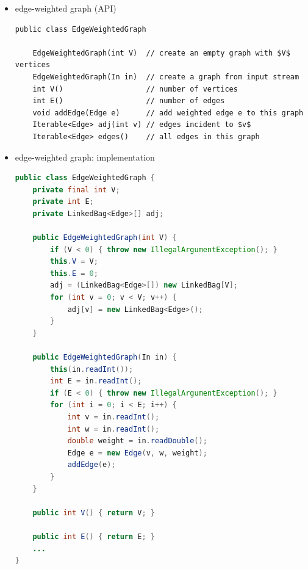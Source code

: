\documentclass[8pt,a4paper,compress]{beamer}
\begin{document}
\begin{frame}[fragile]
\begin{itemize}
\item edge-weighted graph (API)
\begin{lstlisting}[language={},mathescape]
public class EdgeWeightedGraph

    EdgeWeightedGraph(int V)  // create an empty graph with $V$ vertices
    EdgeWeightedGraph(In in)  // create a graph from input stream
    int V()                   // number of vertices 
    int E()                   // number of edges
    void addEdge(Edge e)      // add weighted edge e to this graph
    Iterable<Edge> adj(int v) // edges incident to $v$
    Iterable<Edge> edges()    // all edges in this graph
\end{lstlisting}
\end{itemize}
\end{frame}

\begin{frame}[fragile]
\begin{itemize}
\item edge-weighted graph: implementation
\begin{lstlisting}[language=Java]
public class EdgeWeightedGraph {
    private final int V;
    private int E;
    private LinkedBag<Edge>[] adj;
    
    public EdgeWeightedGraph(int V) {
        if (V < 0) { throw new IllegalArgumentException(); }
        this.V = V;
        this.E = 0;
        adj = (LinkedBag<Edge>[]) new LinkedBag[V];
        for (int v = 0; v < V; v++) {
            adj[v] = new LinkedBag<Edge>();
        }
    }

    public EdgeWeightedGraph(In in) {
        this(in.readInt());
        int E = in.readInt();
        if (E < 0) { throw new IllegalArgumentException(); }
        for (int i = 0; i < E; i++) {
            int v = in.readInt();
            int w = in.readInt();
            double weight = in.readDouble();
            Edge e = new Edge(v, w, weight);
            addEdge(e);
        }
    }
    
    public int V() { return V; }

    public int E() { return E; }
    ...
}
\end{lstlisting}
\end{itemize}
\end{frame}
\end{document}
